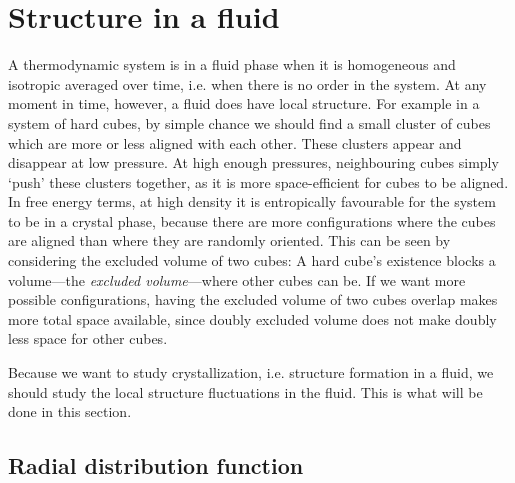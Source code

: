 \documentclass[thesis]{subfiles}
\begin{document}
\newpage

\section{Structure in a fluid}

A thermodynamic system is in a fluid phase when it is homogeneous and isotropic averaged over time, i.e. when there is no order in the system. At any moment in time, however, a fluid does have local structure. For example in a system of hard cubes, by simple chance we should find a small cluster of cubes which are more or less aligned with each other. These clusters appear and disappear at low pressure. At high enough pressures, neighbouring cubes simply `push' these clusters together, as it is more space-efficient for cubes to be aligned. In free energy terms, at high density it is entropically favourable for the system to be in a crystal phase, because there are more configurations where the cubes are aligned than where they are randomly oriented. This can be seen by considering the excluded volume of two cubes: A hard cube's existence blocks a volume---the \emph{excluded volume}---where other cubes can be. If we want more possible configurations, having the excluded volume of two cubes overlap makes more total space available, since doubly excluded volume does not make doubly less space for other cubes.

Because we want to study crystallization, i.e. structure formation in a fluid, we should study the local structure fluctuations in the fluid. This is what will be done in this section.

\subsection{Radial distribution function}
\end{document}
